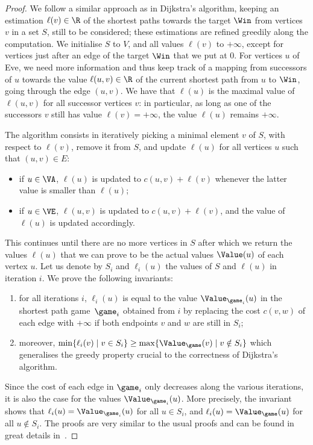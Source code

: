 \begin{proof}
  We follow a similar approach as in Dijkstra's algorithm, keeping an
  estimation $\ell(v)\in\R$ of the shortest paths towards the target
  $\Win$ from vertices $v$ in a set $S$, still to be considered; these
  estimations are refined greedily along the computation. We
  initialise $S$ to $V$, and all values $\ell(v)$ to $+\infty$, except
  for vertices just after an edge of the target $\Win$ that we put at
  $0$. For vertices $u$ of Eve, we need more information and thus keep
  track of a mapping from successors of $u$ towards the value
  $\ell(u,v)\in\R$ of the current shortest path from $u$ to $\Win$,
  going through the edge $(u,v)$. We have that $\ell(u)$ is the
  maximal value of $\ell(u,v)$ for all successor vertices $v$: in
  particular, as long as one of the successors $v$ still has value
  $\ell(v)=+\infty$, the value $\ell(u)$ remains $+\infty$.

  The algorithm consists in iteratively picking a minimal element $v$
  of $S$, with respect to $\ell(v)$, remove it from $S$, and update
  $\ell(u)$ for all vertices $u$ such that $(u,v)\in E$:
  \begin{itemize}
  \item if $u\in \VA$, $\ell(u)$ is updated to $c(u,v)+\ell(v)$
    whenever the latter value is smaller than $\ell(u)$;
  \item if $u\in \VE$, $\ell(u,v)$ is updated to $c(u,v)+\ell(v)$, and
    the value of $\ell(u)$ is updated accordingly.
  \end{itemize}

  This continues until there are no more vertices in $S$ after which
  we return the values $\ell(u)$ that we can prove to be the actual
  values $\Value(u)$ of each vertex $u$. Let us denote by $S_i$ and
  $\ell_i(u)$ the values of $S$ and $\ell(u)$ in iteration $i$. We
  prove the following invariants:
  \begin{enumerate}
  \item for all iterations $i$, $\ell_i(u)$ is equal to the value
    $\Value_{\game_i}(u)$ in the shortest path game~$\game_i$ obtained
    from $i$ by replacing the cost $c(v,w)$ of each edge with
    $+\infty$ if both endpoints $v$ and $w$ are still in $S_i$;
  \item moreover,
    $\min\{\ell_i(v)\mid v\in S_i\}\geq \max\{\Value_{\game}(v)\mid
    v\notin S_i\}$ which generalises the greedy property crucial to
    the correctness of Dijkstra's algorithm.
  \end{enumerate}
  Since the cost of each edge in $\game_i$ only decreases along the
  various iterations, it is also the case for the values
  $\Value_{\game_i}(u)$. More precisely, the invariant shows that
  $\ell_i(u)=\Value_{\game_i}(u)$ for all $u\in S_i$, and
  $\ell_i(u)=\Value_{\game}(u)$ for all $u\notin S_i$. The proofs are
  very similar to the usual proofs and can be found in great details
  in~\cite{Khachiyan&al:2008}.


\end{proof}
